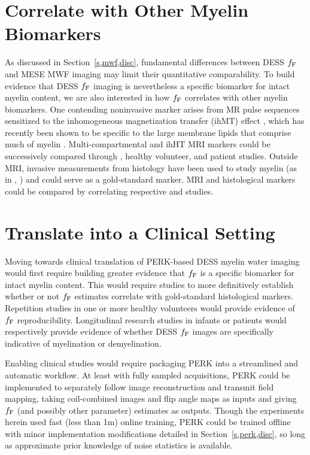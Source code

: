 \section{Correlate with Other Myelin Biomarkers}
\label{s,future,myelin}

As discussed in Section~\ref{s,mwf,disc},
fundamental differences 
between DESS $f_{\mathrm{F}}$ and MESE MWF imaging
may limit their quantitative comparability.
To build evidence 
that DESS $f_{\mathrm{F}}$ imaging
is nevertheless a specific biomarker
for intact myelin content,
we are also interested 
in how $f_{\mathrm{F}}$ correlates 
with other myelin biomarkers.
One contending noninvasive marker arises
from MR pulse sequences sensitized
to the inhomogeneous magnetization transfer (ihMT) effect
\cite{varma:15:mtf},
which has recently been shown
to be specific
to the large membrane lipids
that comprise much of myelin
\cite{varma:15:iom, swanson:17:mda}.
Multi-compartmental and ihHT MRI markers 
could be successively compared 
through \exvivo, healthy volunteer, and patient studies.
Outside MRI,
invasive measurements
from histology
have been used to study myelin 
(as in \eg, \cite{gareau:00:mta, webb:03:imt})
and could serve as a gold-standard \insitu marker.
MRI and histological markers
could be compared 
by correlating respective \exvivo and \insitu studies.

\section{Translate into a Clinical Setting}
\label{s,future,clinic}

Moving towards clinical translation
of PERK-based DESS myelin water imaging
would first require building greater evidence
that $f_{\mathrm{F}}$ is a specific biomarker 
for intact myelin content.
This would require \insitu studies
to more definitively establish
whether or not $f_{\mathrm{F}}$ estimates
correlate with gold-standard histological markers.
Repetition studies in one or more healthy volunteers 
would provide evidence of $f_{\mathrm{F}}$ reproducibility.
Longitudinal research studies in infants or patients
would respectively provide evidence of whether 
DESS $f_{\mathrm{F}}$ images are specifically indicative
of myelination or demyelination. 

Enabling clinical studies
would require packaging PERK
into a streamlined and automatic workflow.
At least with fully sampled acquisitions,
PERK could be implemented 
to separately follow image reconstruction
and transmit field mapping,
taking coil-combined images and flip angle maps as inputs
and giving $f_{\mathrm{F}}$ (and possibly other parameter) estimates as outputs.
Though the experiments herein
used fast (less than 1m) online training,
PERK could be trained offline 
with minor implementation modifications
detailed in Section~\ref{s,perk,disc},
so long as approximate prior knowledge 
of noise statistics is available.

